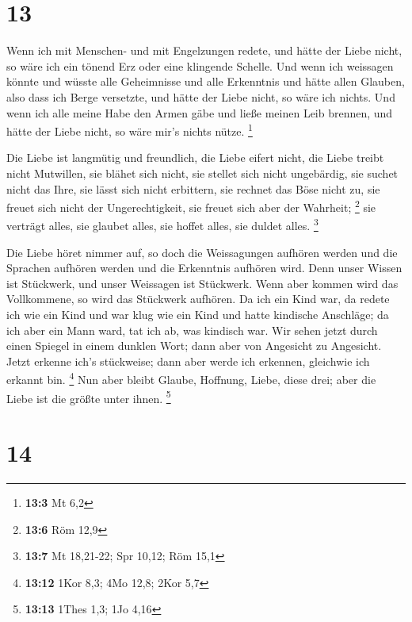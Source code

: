 \hypertarget{section-7}{%
\section{13}\label{section-7}}

 Wenn ich mit Menschen- und mit Engelzungen redete, und
hätte der Liebe nicht, so wäre ich ein tönend Erz oder eine klingende
Schelle.  Und wenn ich weissagen könnte und wüsste alle
Geheimnisse und alle Erkenntnis und hätte allen Glauben, also dass ich
Berge versetzte, und hätte der Liebe nicht, so wäre ich nichts.
 Und wenn ich alle meine Habe den Armen gäbe und ließe
meinen Leib brennen, und hätte der Liebe nicht, so wäre mir's nichts
nütze. \footnote{\textbf{13:3} Mt 6,2}

 Die Liebe ist langmütig und freundlich, die Liebe eifert
nicht, die Liebe treibt nicht Mutwillen, sie blähet sich nicht,
 sie stellet sich nicht ungebärdig, sie suchet nicht das
Ihre, sie lässt sich nicht erbittern, sie rechnet das Böse nicht zu,
 sie freuet sich nicht der Ungerechtigkeit, sie freuet
sich aber der Wahrheit; \footnote{\textbf{13:6} Röm 12,9} 
sie verträgt alles, sie glaubet alles, sie hoffet alles, sie duldet
alles. \footnote{\textbf{13:7} Mt 18,21-22; Spr 10,12; Röm 15,1}

 Die Liebe höret nimmer auf, so doch die Weissagungen
aufhören werden und die Sprachen aufhören werden und die Erkenntnis
aufhören wird.  Denn unser Wissen ist Stückwerk, und unser
Weissagen ist Stückwerk.  Wenn aber kommen wird das
Vollkommene, so wird das Stückwerk aufhören.  Da ich ein
Kind war, da redete ich wie ein Kind und war klug wie ein Kind und hatte
kindische Anschläge; da ich aber ein Mann ward, tat ich ab, was kindisch
war.  Wir sehen jetzt durch einen Spiegel in einem
dunklen Wort; dann aber von Angesicht zu Angesicht. Jetzt erkenne ich's
stückweise; dann aber werde ich erkennen, gleichwie ich erkannt bin.
\footnote{\textbf{13:12} 1Kor 8,3; 4Mo 12,8; 2Kor 5,7} 
Nun aber bleibt Glaube, Hoffnung, Liebe, diese drei; aber die Liebe ist
die größte unter ihnen. \footnote{\textbf{13:13} 1Thes 1,3; 1Jo 4,16}

\hypertarget{section-8}{%
\section{14}\label{section-8}}

